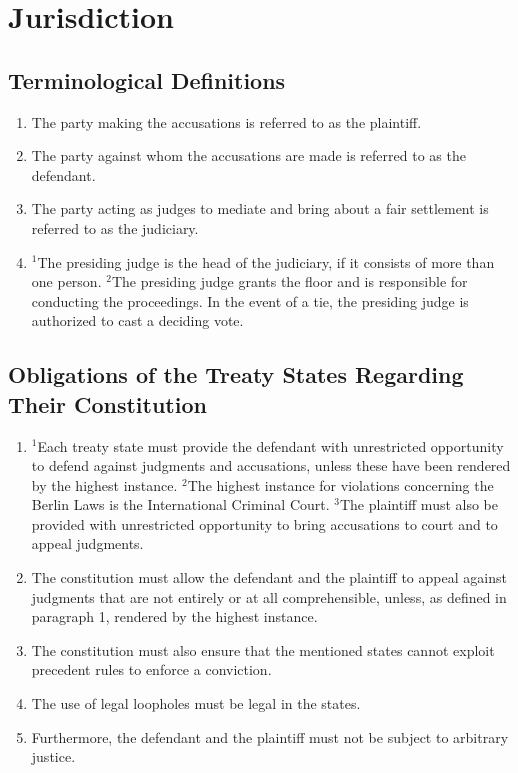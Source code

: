 \documentclass{article}
\begin{document}
\section{Jurisdiction}
\subsection{Terminological Definitions}
\begin{enumerate}[(1)]
    \item The party making the accusations is referred to as the plaintiff.
    \item The party against whom the accusations are made is referred to as the defendant.
    \item The party acting as judges to mediate and bring about a fair settlement is referred to as the judiciary.
    \item ${^1}$The presiding judge is the head of the judiciary, if it consists of more than one person. ${^2}$The presiding judge grants the floor and is responsible for conducting the proceedings. In the event of a tie, the presiding judge is authorized to cast a deciding vote.
\end{enumerate}

\subsection{Obligations of the Treaty States Regarding Their Constitution}
\begin{enumerate}[(1)]
    \item ${^1}$Each treaty state must provide the defendant with unrestricted opportunity to defend against judgments and accusations, unless these have been rendered by the highest instance. ${^2}$The highest instance for violations concerning the Berlin Laws is the International Criminal Court. ${^3}$The plaintiff must also be provided with unrestricted opportunity to bring accusations to court and to appeal judgments.
    \item The constitution must allow the defendant and the plaintiff to appeal against judgments that are not entirely or at all comprehensible, unless, as defined in paragraph 1, rendered by the highest instance.
    \item The constitution must also ensure that the mentioned states cannot exploit precedent rules to enforce a conviction.
    \item The use of legal loopholes must be legal in the states.
    \item Furthermore, the defendant and the plaintiff must not be subject to arbitrary justice.
\end{enumerate}
\end{document}
